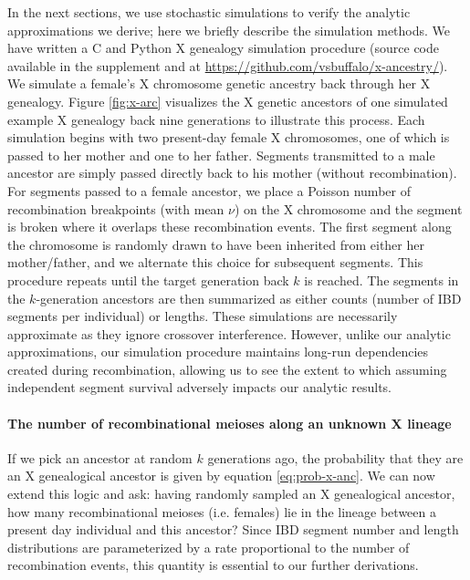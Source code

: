 \documentclass[11pt]{article}
\begin{document}
In the next sections, we use stochastic simulations to verify the analytic
approximations we derive; here we briefly describe the simulation methods. We
have written a C and Python X genealogy simulation procedure (source code
available in the supplement and at
\url{https://github.com/vsbuffalo/x-ancestry/}). We simulate a female's X
chromosome genetic ancestry back through her X genealogy. Figure
\ref{fig:x-arc} visualizes the X genetic ancestors of one simulated example X
genealogy back nine generations to illustrate this process. Each simulation
begins with two present-day female X chromosomes, one of which is passed to her
mother and one to her father. Segments transmitted to a male ancestor are
simply passed directly back to his mother (without recombination). For segments
passed to a female ancestor, we place a Poisson number of recombination
breakpoints (with mean $\nu$) on the X chromosome and the segment is broken
where it overlaps these recombination events. The first segment along the
chromosome is randomly drawn to have been inherited from either her
mother/father, and we alternate this choice for subsequent segments. This
procedure repeats until the target generation back $k$ is reached. The segments
in the $k$-generation ancestors are then summarized as either counts (number of
IBD segments per individual) or lengths.  These simulations are necessarily
approximate as they ignore crossover interference.  However, unlike our
analytic approximations, our simulation procedure maintains long-run
dependencies created during recombination, allowing us to see the extent to
which assuming independent segment survival adversely impacts our analytic
results.

\paragraph{The number of recombinational meioses along an unknown X lineage}

If we pick an ancestor at random $k$ generations ago, the probability that they
are an X genealogical ancestor is given by equation \eqref{eq:prob-x-anc}. We
can now extend this logic and ask: having randomly sampled an X genealogical
ancestor, how many recombinational meioses (i.e. females) lie in the lineage
between a present day individual and this ancestor? Since IBD segment number
and length distributions are parameterized by a rate proportional to the number
of recombination events, this quantity is essential to our further derivations.
\end{document}

